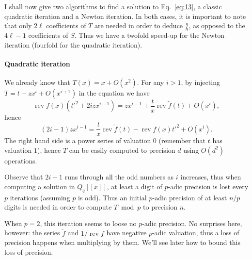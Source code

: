 \documentclass{article}
\DeclareMathOperator{\rev}{rev}
\begin{document}
I shall now give two algorithms to find a solution to
Eq.~\eqref{eq:13}, a classic quadratic iteration and a Newton
iteration. In both cases, it is important to note that only $2\ell$
coefficients of $T$ are needed in order to deduce $\frac{g}{h}$, as
opposed to the $4\ell-1$ coefficients of $S$. Thus we have a twofold
speed-up for the Newton iteration (fourfold for the quadratic
iteration).

\paragraph{Quadratic iteration}
We already know that $T(x) = x + O(x^2)$. For any $i>1$, by injecting
$T = t + zx^i + O(x^{i+1})$ in the equation we have
\begin{equation}
  \label{eq:14}
  \rev f(x)(t'^2 + 2izx^{i-1}) = zx^{i-1} + \frac{t}{x}\rev\tilde{f}(t) + O(x^i),
\end{equation}
hence
\begin{equation}
  \label{eq:15}
  (2i-1)zx^{i-1} = \frac{t}{x}\rev\tilde{f}(t) - \rev f(x)t'^2 + O(x^i).
\end{equation}
The right hand side is a power series of valuation $0$ (remember that
$t$ has valuation $1$), hence $T$ can be easily computed to precision
$d$ using $O(d^2)$ operations. 

Observe that $2i-1$ runs through all the odd numbers as $i$ increases,
thus when computing a solution in $Q_q[[x]]$, at least a digit of
$p$-adic precision is lost every $p$ iterations (assuming $p$ is
odd). Thus an initial $p$-adic precision of at least $n/p$ digits
is needed in order to compute $T \bmod p$ to precision $n$.

When $p=2$, this iteration seems to loose no $p$-adic precision. No
surprises here, however: the series $\tilde{f}$ and $1/\rev f$ have
negative $p$-adic valuation, thus a loss of precision happens when
multiplying by them. We'll see later how to bound this loss of
precision.
\end{document}
